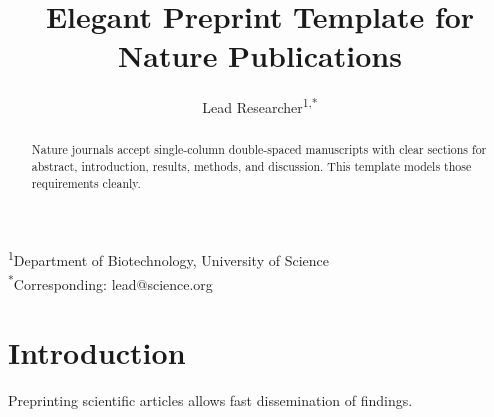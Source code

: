 \documentclass[11pt]{article}
\title{\bfseries Elegant Preprint Template for Nature Publications}
\author{Lead Researcher\textsuperscript{1,*}}
\date{}
\begin{document}
\maketitle

\noindent \textsuperscript{1}Department of Biotechnology, University of Science \\
\noindent \textsuperscript{*}Corresponding: lead@science.org

\begin{abstract}
Nature journals accept single-column double-spaced manuscripts with clear sections for abstract, introduction, results, methods, and discussion. This template models those requirements cleanly.
\end{abstract}

\section{Introduction}
Preprinting scientific articles allows fast dissemination of findings.
\end{document}
